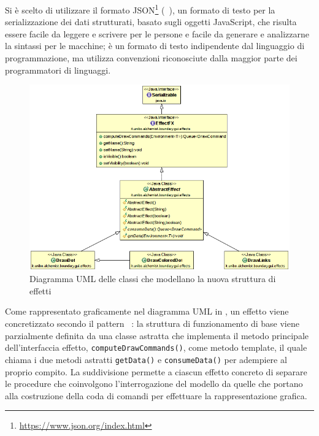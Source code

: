 \begin{itemize}
                        Si è scelto di utilizzare il formato JSON\footnote{\url{https://www.json.org/index.html}} (~\cite{json}), un formato di testo per la serializzazione dei dati strutturati, basato sugli oggetti JavaScript, che risulta essere facile da leggere e scrivere per le persone e facile da generare e analizzarne la sintassi per le macchine;
                        è un formato di testo indipendente dal linguaggio di programmazione, ma utilizza convenzioni riconosciute dalla maggior parte dei programmatori di linguaggi.

                \end{itemize}

                \begin{figure}[htbp]
                    \centering
                    \includegraphics[scale=0.5]{img/EffectFXUMLsimple}
                    \caption{%
                        Diagramma UML delle classi che modellano la nuova struttura di effetti%
                    }
                    \label{fig:effectFX}
                \end{figure}

                Come rappresentato graficamente nel diagramma UML in , un effetto viene concretizzato secondo il pattern ~\cite{templateMethod}:
                la struttura di funzionamento di base viene parzialmente definita da una classe astratta che implementa il metodo principale dell'interfaccia effetto, \texttt{computeDrawCommands()}, come metodo template, il quale chiama i due metodi astratti \texttt{getData()} e \texttt{consumeData()} per adempiere al proprio compito.
                La suddivisione permette a ciascun effetto concreto di separare le procedure che coinvolgono l'interrogazione del modello da quelle che portano alla costruzione della coda di comandi per effettuare la rappresentazione grafica.

